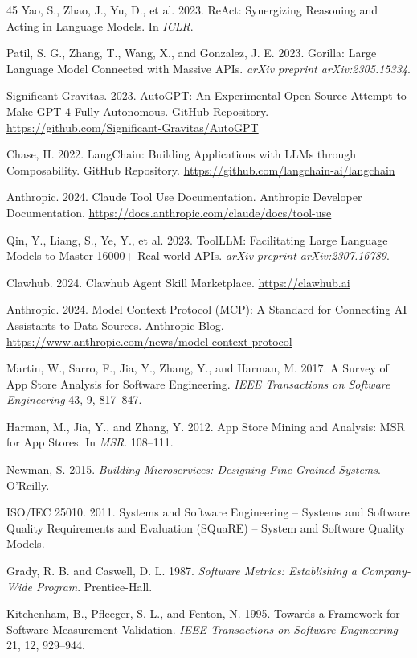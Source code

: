 \documentclass[sigconf,review,anonymous,nonacm]{acmart}
\begin{document}
\begin{thebibliography}{45}
Yao, S., Zhao, J., Yu, D., et al. 2023. ReAct: Synergizing Reasoning and Acting in Language Models. In \textit{ICLR}.

Patil, S. G., Zhang, T., Wang, X., and Gonzalez, J. E. 2023. Gorilla: Large Language Model Connected with Massive APIs. \textit{arXiv preprint arXiv:2305.15334}.

Significant Gravitas. 2023. AutoGPT: An Experimental Open-Source Attempt to Make GPT-4 Fully Autonomous. GitHub Repository. \url{https://github.com/Significant-Gravitas/AutoGPT}

Chase, H. 2022. LangChain: Building Applications with LLMs through Composability. GitHub Repository. \url{https://github.com/langchain-ai/langchain}

Anthropic. 2024. Claude Tool Use Documentation. Anthropic Developer Documentation. \url{https://docs.anthropic.com/claude/docs/tool-use}

Qin, Y., Liang, S., Ye, Y., et al. 2023. ToolLLM: Facilitating Large Language Models to Master 16000+ Real-world APIs. \textit{arXiv preprint arXiv:2307.16789}.

Clawhub. 2024. Clawhub Agent Skill Marketplace. \url{https://clawhub.ai}

Anthropic. 2024. Model Context Protocol (MCP): A Standard for Connecting AI Assistants to Data Sources. Anthropic Blog. \url{https://www.anthropic.com/news/model-context-protocol}

Martin, W., Sarro, F., Jia, Y., Zhang, Y., and Harman, M. 2017. A Survey of App Store Analysis for Software Engineering. \textit{IEEE Transactions on Software Engineering} 43, 9, 817--847.

Harman, M., Jia, Y., and Zhang, Y. 2012. App Store Mining and Analysis: MSR for App Stores. In \textit{MSR}. 108--111.

Newman, S. 2015. \textit{Building Microservices: Designing Fine-Grained Systems}. O'Reilly.

ISO/IEC 25010. 2011. Systems and Software Engineering -- Systems and Software Quality Requirements and Evaluation (SQuaRE) -- System and Software Quality Models.

Grady, R. B. and Caswell, D. L. 1987. \textit{Software Metrics: Establishing a Company-Wide Program}. Prentice-Hall.

Kitchenham, B., Pfleeger, S. L., and Fenton, N. 1995. Towards a Framework for Software Measurement Validation. \textit{IEEE Transactions on Software Engineering} 21, 12, 929--944.


\end{thebibliography}
\end{document}

